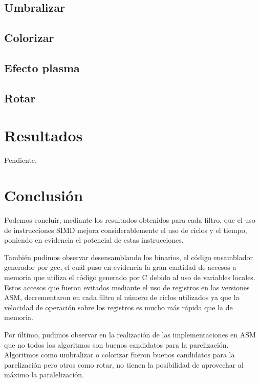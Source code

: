 \documentclass[a4paper,10pt,twoside]{article}
\begin{document}


\subsection{Umbralizar}



\subsection{Colorizar}



\subsection{Efecto plasma}

%

\subsection{Rotar}





\section{Resultados}

Pendiente.




\section{Conclusión}

Podemos concluir, mediante los resultados obtenidos para cada filtro, que el uso de instrucciones SIMD mejora considerablemente el uso de ciclos y el tiempo, poniendo en evidencia el potencial de estas instrucciones.

También pudimos observar desensamblando los binarios, el código ensamblador generador por gcc, el cuál puso en evidencia la gran cantidad de accesos a memoria que utiliza el código generado por C debido al uso de variables locales. Estos accesos que fueron evitados mediante el uso de registros en las versiones ASM, decrementaron en cada filtro el número de ciclos utilizados ya que la velocidad de operación sobre los registros es mucho más rápida que la de memoria.

Por último, pudimos observar en la realización de las implementaciones en ASM que no todos los algoritmos son buenos candidatos para la parelización. Algoritmos como umbralizar o colorizar fueron buenos candidatos para la parelización pero otros como rotar, no tienen la posibilidad de aprovechar al máximo la paralelización.
\end{document}
